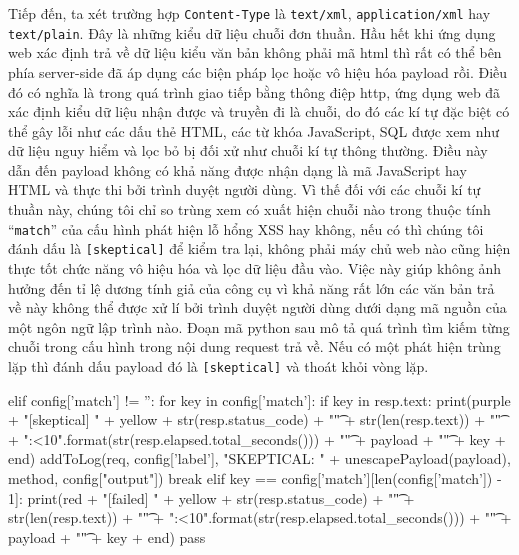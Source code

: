 Tiếp đến, ta xét trường hợp \texttt{Content-Type} là \texttt{text/xml}, \texttt{application/xml} hay \texttt{text/plain}. Đây là những kiểu dữ liệu chuỗi đơn thuần. Hầu hết khi ứng dụng web xác định trả về dữ liệu kiểu văn bản không phải mã \acrshort{html} thì rất có thể bên phía server-side đã áp dụng các biện pháp lọc hoặc vô hiệu hóa payload rồi. Điều đó có nghĩa là trong quá trình giao tiếp bằng thông điệp \acrshort{http}, ứng dụng web đã xác định kiểu dữ liệu nhận được và truyền đi là chuỗi, do đó các kí tự đặc biệt có thể gây lỗi như các dấu thẻ HTML, các từ khóa JavaScript, SQL được xem như dữ liệu nguy hiểm và lọc bỏ bị đối xử như chuỗi kí tự thông thường. Điều này dẫn đến payload không có khả năng được nhận dạng là mã JavaScript hay HTML và thực thi bởi trình duyệt người dùng. Vì thế đối với các chuỗi kí tự thuần này, chúng tôi chỉ so trùng xem có xuất hiện chuỗi nào trong thuộc tính ``\texttt{match}'' của cấu hình phát hiện lỗ hổng XSS hay không, nếu có thì chúng tôi đánh dấu là \texttt{[skeptical]} để kiểm tra lại, không phải máy chủ web nào cũng hiện thực tốt chức năng vô hiệu hóa và lọc dữ liệu đầu vào. Việc này giúp không ảnh hưởng đến tỉ lệ dương tính giả của công cụ vì khả năng rất lớn các văn bản trả về này không thể được xử lí bởi trình duyệt người dùng dưới dạng mã nguồn của một ngôn ngữ lập trình nào. Đoạn mã python sau mô tả quá trình tìm kiếm từng chuỗi trong cấu hình trong nội dung request trả về. Nếu có một phát hiện trùng lặp thì đánh dấu payload đó là \texttt{[skeptical]} và thoát khỏi vòng lặp.\\
\begin{python}
elif config['match'] != '':
    for key in config['match']:
        if key in resp.text:
            print(purple + "[skeptical]    " + yellow + str(resp.status_code) + "\t" + str(len(resp.text)) + "\t" + "{:<10}".format(str(resp.elapsed.total_seconds())) + "\t" +  payload + "\t" + key +  end)
            addToLog(req, config['label'], "SKEPTICAL: " + unescapePayload(payload), method, config["output"])
            break
        elif key == config['match'][len(config['match']) - 1]:
            print(red + "[failed]    " + yellow + str(resp.status_code) + "\t" + str(len(resp.text)) + "\t" + "{:<10}".format(str(resp.elapsed.total_seconds())) + "\t" +  payload + "\t" + key +  end)
            pass
\end{python}


